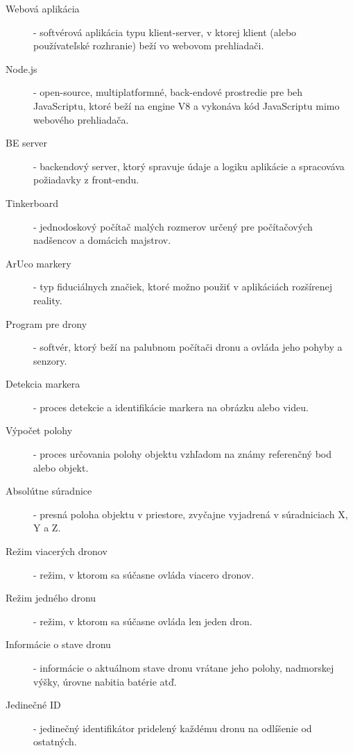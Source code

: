 \documentclass[]{tukediphc}
\begin{document}
\begin{description}
	\item[Webová aplikácia] - softvérová aplikácia typu klient-server, v ktorej klient (alebo používateľské rozhranie) beží vo webovom prehliadači.
	\item[Node.js] - open-source, multiplatformné, back-endové prostredie pre beh JavaScriptu, ktoré beží na engine V8 a vykonáva kód JavaScriptu mimo webového prehliadača.	
	\item[BE server] - backendový server, ktorý spravuje údaje a logiku aplikácie a spracováva požiadavky z front-endu.	
	\item[Tinkerboard] - jednodoskový počítač malých rozmerov určený pre počítačových nadšencov a domácich majstrov.	
	\item[ArUco markery] - typ fiduciálnych značiek, ktoré možno použiť v aplikáciách rozšírenej reality.	
	\item[Program pre drony] - softvér, ktorý beží na palubnom počítači dronu a ovláda jeho pohyby a senzory.
	\item[Detekcia markera] - proces detekcie a identifikácie markera na obrázku alebo videu.	
	\item[Výpočet polohy] - proces určovania polohy objektu vzhľadom na známy referenčný bod alebo objekt.	
	\item[Absolútne súradnice] - presná poloha objektu v priestore, zvyčajne vyjadrená v súradniciach X, Y a Z.	
	\item[Režim viacerých dronov] - režim, v ktorom sa súčasne ovláda viacero dronov.	
	\item[Režim jedného dronu] - režim, v ktorom sa súčasne ovláda len jeden dron.	
	\item[Informácie o stave dronu] - informácie o aktuálnom stave dronu vrátane jeho polohy, nadmorskej výšky, úrovne nabitia batérie atď.
	\item[Jedinečné ID] - jedinečný identifikátor pridelený každému dronu na odlíšenie od ostatných.
\end{description}

\kslovnikterminov
%

%

%

%

%   

%

%

%

%
%  


% 
%
% 
% 
% 
% 
%
\newpage
{}
\protect\label{page:posledna}
\end{document}
